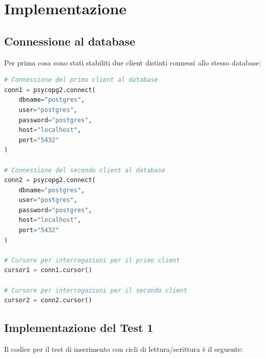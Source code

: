\documentclass[a4paper,12pt]{report}
\begin{document}
\chapter{Implementazione}
\section{Connessione al database}
Per prima cosa sono stati stabiliti due client distinti connessi allo stesso database:

\begin{lstlisting}[language=Python]
# Connessione del primo client al database
conn1 = psycopg2.connect(
    dbname="postgres",
    user="postgres",
    password="postgres",
    host="localhost",
    port="5432"
)

# Connessione del secondo client al database
conn2 = psycopg2.connect(
    dbname="postgres",
    user="postgres",
    password="postgres",
    host="localhost",
    port="5432"
)

# Cursore per interrogazioni per il primo client
cursor1 = conn1.cursor()

# Cursore per interrogazioni per il secondo client
cursor2 = conn2.cursor()
\end{lstlisting}

\section{Implementazione del Test 1}
Il codice per il test di inserimento con cicli di lettura/scrittura è il seguente:
\end{document}
